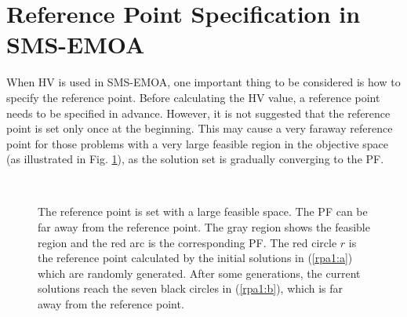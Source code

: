 \documentclass[conference]{IEEEtran}
\begin{document}
%
%
\section{Reference Point Specification in SMS-EMOA}
When HV is used in SMS-EMOA, 
one important thing to be considered is how to specify the reference point.
Before calculating the HV value, a reference point needs to be specified in advance.
However, it is not suggested that the reference point is set only once at the beginning. 
This may cause a very faraway reference point 
for those problems with a very large feasible region in the objective space (as illustrated in Fig. \ref{rpa1}),
as the solution set is gradually converging to the PF. 

\begin{figure}[!t]
  \centering
  \quad
  \\
  \caption{The reference point is set with a large feasible space.
  The PF can be far away from the reference point.
  The gray region shows the feasible region and the red arc is the corresponding PF.
  The red circle $r$ is the reference point calculated by the initial solutions in (\ref{rpa1:a})
  which are randomly generated. 
  After some generations, the current solutions reach the seven black circles in (\ref{rpa1:b}), 
  which is far away from the reference point.}
  \label{rpa1}
\end{figure}
\end{document}
